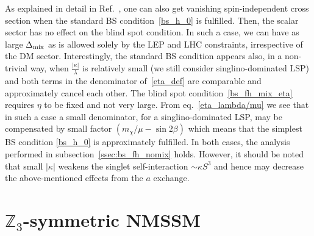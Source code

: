 \documentclass[12pt,twoside]{article}
\begin{document}
As explained in detail in Ref.~\cite{BS_NMSSM}, 
one can also get vanishing spin-independent cross section when the standard 
BS condition~\eqref{bs_h_0} is fulfilled. Then, the scalar sector has no effect 
on the blind spot condition. In such a case, we can have as large 
$\Delta_{\rm mix}$ as is allowed solely by the LEP and LHC constraints, 
irrespective of the DM sector. 
Interestingly, the standard BS condition appears 
also, in a non-trivial way, when $\frac{|\kappa|}{\lambda}$ is relatively 
small (we still consider singlino-dominated LSP) and both terms in the 
denominator of~\eqref{eta_def} are comparable and approximately cancel each 
other. The blind spot condition~\eqref{bs_fh_mix_eta} requires 
$\eta$ to be fixed and not very large. From eq.~\eqref{eta_lambda/mu} 
we see that in such a case a small denominator, for a singlino-dominated LSP, 
may be compensated by small factor $(m_\chi/\mu-\sin2\beta)$ which means 
that the simplest BS condition \eqref{bs_h_0} is approximately fulfilled.
In both cases, the analysis 
performed in subsection~\ref{ssec:bs_fh_nomix} holds. However, it should 
be noted that small $|\kappa|$ weakens the singlet self-interaction 
$\sim\kappa S^3$ and hence may decrease the above-mentioned effects 
from the $a$ exchange.


\section{$\mathbb{Z}_3$-symmetric NMSSM}
\label{sec:Z3}
\end{document}
